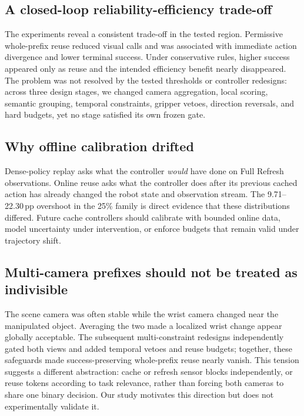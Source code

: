 \documentclass[11pt]{article}
\newcommand{\pp}{\,pp}
\begin{document}
\subsection{A closed-loop reliability-efficiency trade-off}

The experiments reveal a consistent trade-off in the tested region. Permissive whole-prefix reuse reduced visual calls and was associated with immediate action divergence and lower terminal success. Under conservative rules, higher success appeared only as reuse and the intended efficiency benefit nearly disappeared. The problem was not resolved by the tested thresholds or controller redesigns: across three design stages, we changed camera aggregation, local scoring, semantic grouping, temporal constraints, gripper vetoes, direction reversals, and hard budgets, yet no stage satisfied its own frozen gate.

\subsection{Why offline calibration drifted}

Dense-policy replay asks what the controller \emph{would} have done on Full Refresh observations. Online reuse asks what the controller does after its previous cached action has already changed the robot state and observation stream. The 9.71--22.30\pp{} overshoot in the 25\% family is direct evidence that these distributions differed. Future cache controllers should calibrate with bounded online data, model uncertainty under intervention, or enforce budgets that remain valid under trajectory shift.

\subsection{Multi-camera prefixes should not be treated as indivisible}

The scene camera was often stable while the wrist camera changed near the manipulated object. Averaging the two made a localized wrist change appear globally acceptable. The subsequent multi-constraint redesigns independently gated both views and added temporal vetoes and reuse budgets; together, these safeguards made success-preserving whole-prefix reuse nearly vanish. This tension suggests a different abstraction: cache or refresh sensor blocks independently, or reuse tokens according to task relevance, rather than forcing both cameras to share one binary decision. Our study motivates this direction but does not experimentally validate it.
\end{document}
